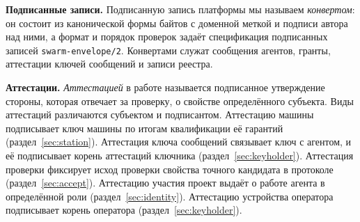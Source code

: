 \documentclass[10pt,a4paper]{article}
\begin{document}
\textbf{Подписанные записи.} Подписанную запись платформы мы называем \emph{конвертом}: он состоит из канонической формы байтов с доменной меткой и подписи автора над ними, а формат и порядок проверок задаёт спецификация подписанных записей \texttt{swarm-envelope/2}. Конвертами служат сообщения агентов, гранты, аттестации ключей сообщений и записи реестра.

\textbf{Аттестации.} \emph{Аттестацией} в работе называется подписанное утверждение стороны, которая отвечает за проверку, о свойстве определённого субъекта. Виды аттестаций различаются субъектом и подписантом. Аттестацию машины подписывает ключ машины по итогам квалификации её гарантий (раздел~\ref{sec:station}). Аттестация ключа сообщений связывает ключ с агентом, и её подписывает корень аттестаций ключника (раздел~\ref{sec:keyholder}). Аттестация проверки фиксирует исход проверки свойства точного кандидата в протоколе (раздел~\ref{sec:accept}). Аттестацию участия проект выдаёт о работе агента в определённой роли (раздел~\ref{sec:identity}). Аттестацию устройства оператора подписывает корень оператора (раздел~\ref{sec:keyholder}).
\end{document}
